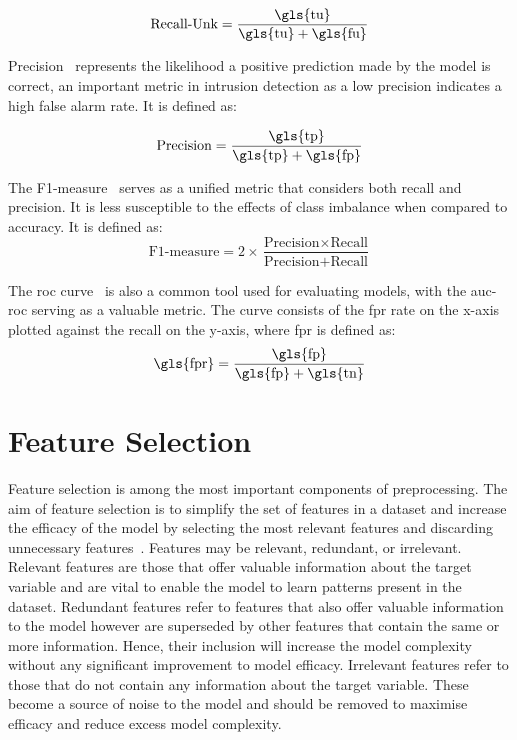 \[ \text{Recall-Unk} = \frac{\text{\gls{tu}}}{\text{\gls{tu}}+\text{\gls{fu}}} \]

Precision~\cite{metrics} represents the likelihood a positive prediction made
by the model is correct, an important metric in intrusion detection as a low
precision indicates a high false alarm rate. It is defined as:

\[ \text{Precision} = \frac{\text{\gls{tp}}}{\text{\gls{tp}}+\text{\gls{fp}}}
\]

The F1-measure~\cite{metrics} serves as a unified metric that considers both
recall and precision. It is less susceptible to the effects of class imbalance
when compared to accuracy. It is defined as:
\[ \text{F1-measure} = 2 \times \frac{\text{Precision} \times
        \text{Recall}}{\text{Precision} + \text{Recall}} \]

The \gls{roc} curve~\cite{metrics} is also a common tool used for evaluating
models, with the \gls{auc-roc} serving as a valuable metric. The curve consists
of the \gls{fpr} rate on the x-axis plotted against the recall on the y-axis,
where \gls{fpr} is defined as:
\[ \text{\gls{fpr}} = \frac{\text{\gls{fp}}}{\text{\gls{fp}} + \text{\gls{tn}}}
\]



\section{Feature Selection}%
\label{sec:feat_eng}
Feature selection is among the most important components of preprocessing.
The aim of feature selection is to simplify the set of features in a dataset and
increase the efficacy of the model by selecting the most relevant features and
discarding unnecessary features~\cite{feat-sel}. Features may be relevant,
redundant, or irrelevant. Relevant features are those that offer valuable
information about the target variable and are vital to enable the model to
learn patterns present in the dataset. Redundant features refer to features
that also offer valuable information to the model however are superseded by
other features that contain the same or more information. Hence, their
inclusion will increase the model complexity without any significant
improvement to model efficacy. Irrelevant features refer to those that do not
contain any information about the target variable. These become a source of
noise to the model and should be removed to maximise efficacy and reduce excess
model complexity.

